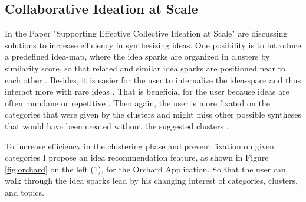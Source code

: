 \documentclass[pdftex,a4paper,12pt]{scrartcl}
\theoremstyle{definition}
\begin{document}
\subsection{Collaborative Ideation at Scale}
    In the Paper "Supporting Effective Collective Ideation at Scale" \citet{siangliulue_supporting_2017} are discussing solutions to increase efficiency in synthesizing ideas. One posibility is to introduce a predefined idea-map, where the idea sparks are organized in clusters by similarity score, so that related and similar idea sparks are positioned near to each other \citep[124]{siangliulue_supporting_2017}. Besides, it is easier for the user to internalize the idea-space and thus interact more with rare ideas \citep{siangliulue_supporting_2017}. That is beneficial for the user because ideas are often mundane or repetitive \citep{siangliulue_ideahound_2016}. Then again, the user is more fixated on the categories that were given by the clusters and might miss other possible syntheses that would have been created without the suggested clusters \citep{siangliulue_supporting_2017}. 
    
    To increase efficiency in the clustering phase and prevent fixation on given categories I propose an idea recommendation feature, as shown in Figure \ref{fig:orchard} on the left (1), for the Orchard Application. So that the user can walk through the idea sparks lead by his changing interest of categories, clusters, and topics. 
    
\end{document}
